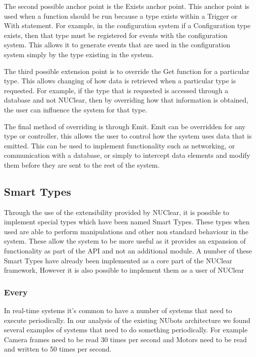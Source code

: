 \documentclass[english,12pt]{scrartcl}
\begin{document}
			The second possible anchor point is the Exists anchor point.
			This anchor point is used when a function should be run because a type exists within a Trigger or With statement.
			For example, in the configuration system if a Configuration type exists, then that type must be registered for events with the configuration system.
			This allows it to generate events that are used in the configuration system simply by the type existing in the system.
			
			The third possible extension point is to override the Get function for a particular type.
			This allows changing of how data is retrieved when a particular type is requested.
			For example, if the type that is requested is accessed through a database and not NUClear, then by overriding how that information is obtained, the user can influence the system for that type.
			
			The final method of overriding is through Emit.
			Emit can be overridden for any type or controller, this allows the user to control how the system uses data that is emitted.
			This can be used to implement functionality such as networking, or communication with a database, or simply to intercept data elements and modify them before they are sent to the rest of the system.
			
		\subsection{Smart Types}
			Through the use of the extensibility provided by NUClear, it is possible to implement special types which have been named Smart Types.
			These types when used are able to perform manipulations and other non standard behaviour in the system.
			These allow the system to be more useful as it provides an expansion of functionality as part of the API and not an additional module.
			A number of these Smart Types have already been implemented as a core part of the NUClear framework, However it is also possible to implement them as a user of NUClear
			
			\subsubsection{Every}
				In real-time systems it's common to have a number of systems that need to execute periodically. 
				In our analysis of the existing NUbots architecture we found several examples of systems that need to do something periodically.
				For example Camera frames need to be read 30 times per second and Motors need to be read and written to 50 times per second. 
				
\end{document}
